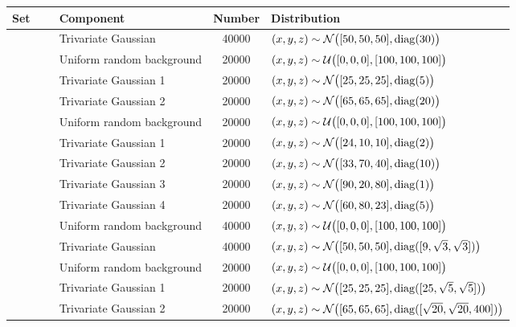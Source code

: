 
\begin{tabular}{@{}cclS[table-format=+1.1e+1,scientific-notation=true,round-mode=places,round-precision=1]l@{}}
\toprule
Set 			&~					& Component					& {Number} 	& Distribution\\
\midrule
\ferdosiOne 	&	& Trivariate Gaussian 		& 40000		& $(x, y, z) \sim \mathcal{N}\big([50, 50, 50], \operatorname{diag}(30)\big)$\\
~ 				&	& Uniform random background	& 20000		& $(x, y, z) \sim \mathcal{U}\big([0, 0, 0], [100, 100, 100]\big)$\\
\hline
\ferdosiTwo 	&	& Trivariate Gaussian 1		& 20000		& $(x, y, z) \sim \mathcal{N}\big([25, 25, 25], \operatorname{diag}(5)\big)$\\
~ 				&	& Trivariate Gaussian 2		& 20000		& $(x, y, z) \sim \mathcal{N}\big([65, 65, 65], \operatorname{diag}(20)\big)$\\
~ 				&	& Uniform random background	& 20000		& $(x, y, z) \sim \mathcal{U}\big([0, 0, 0], [100, 100, 100]\big)$\\
\hline
\ferdosiThree	&	& Trivariate Gaussian 1 	& 20000		& $(x, y, z) \sim \mathcal{N}\big([24, 10, 10], \operatorname{diag}(2)\big)$\\
~ 				&	& Trivariate Gaussian 2 	& 20000		& $(x, y, z) \sim \mathcal{N}\big([33, 70, 40], \operatorname{diag}(10)\big)$\\
~ 				&	& Trivariate Gaussian 3 	& 20000		& $(x, y, z) \sim \mathcal{N}\big([90, 20, 80], \operatorname{diag}(1)\big)$\\
~ 				&	& Trivariate Gaussian 4 	& 20000		& $(x, y, z) \sim \mathcal{N}\big([60, 80, 23], \operatorname{diag}(5)\big)$\\
~ 				&	& Uniform random background	& 40000		& $(x, y, z) \sim \mathcal{U}\big([0, 0, 0], [100, 100, 100]\big)$\\
\hline
\baakmanOne		&	& Trivariate Gaussian 		& 40000		& $(x, y, z) \sim \mathcal{N}\big([50, 50, 50], \operatorname{diag}([9, \sqrt{3}, \sqrt{3}])\big)$\\
~ 				&	& Uniform random background	& 20000		& $(x, y, z) \sim \mathcal{U}\big([0, 0, 0], [100, 100, 100]\big)$\\
\hline
\baakmanTwo		&	& Trivariate Gaussian 1		& 20000		& $(x, y, z) \sim \mathcal{N}\big([25, 25, 25], \operatorname{diag}([25, \sqrt{5}, \sqrt{5}])\big)$\\
~ 				&	& Trivariate Gaussian 2		& 20000		& $(x, y, z) \sim \mathcal{N}\big([65, 65, 65], \operatorname{diag}([\sqrt{20}, \sqrt{20}, 400])\big)$\\

\end{tabular}
